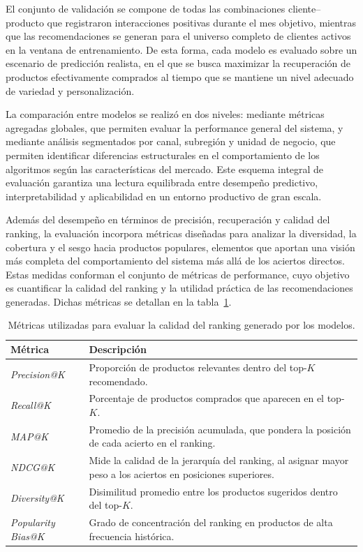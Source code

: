 El conjunto de validación se compone de todas las combinaciones cliente–producto que registraron interacciones positivas durante el mes objetivo, mientras que las recomendaciones se generan para el universo completo de clientes activos en la ventana de entrenamiento. De esta forma, cada modelo es evaluado sobre un escenario de predicción realista, en el que se busca maximizar la recuperación de productos efectivamente comprados al tiempo que se mantiene un nivel adecuado de variedad y personalización.

La comparación entre modelos se realizó en dos niveles: mediante métricas agregadas globales, que permiten evaluar la performance general del sistema, y mediante análisis segmentados por canal, subregión y unidad de negocio, que permiten identificar diferencias estructurales en el comportamiento de los algoritmos según las características del mercado.  
Este esquema integral de evaluación garantiza una lectura equilibrada entre desempeño predictivo, interpretabilidad y aplicabilidad en un entorno productivo de gran escala.  

Además del desempeño en términos de precisión, recuperación y calidad del ranking, la evaluación incorpora métricas diseñadas para analizar la diversidad, la cobertura y el sesgo hacia productos populares, elementos que aportan una visión más completa del comportamiento del sistema más allá de los aciertos directos.
Estas medidas conforman el conjunto de métricas de performance, cuyo objetivo es cuantificar la calidad del ranking y la utilidad práctica de las recomendaciones generadas. Dichas métricas se detallan en la tabla~\ref{tab:eval_performance}.

\begin{table}[H]
    \centering
    \caption[Métricas de performance]{Métricas utilizadas para evaluar la calidad del ranking generado por los modelos.}
    \begin{tabular}{l p{}}
        \toprule
        \textbf{Métrica} & \textbf{Descripción} \\
        \midrule
        \textit{Precision@K} & Proporción de productos relevantes dentro del top-$K$ recomendado. \\
        \textit{Recall@K} & Porcentaje de productos comprados que aparecen en el top-$K$. \\
        \textit{MAP@K} & Promedio de la precisión acumulada, que pondera la posición de cada acierto en el ranking. \\
        \textit{NDCG@K} & Mide la calidad de la jerarquía del ranking, al asignar mayor peso a los aciertos en posiciones superiores. \\
        \textit{Diversity@K} & Disimilitud promedio entre los productos sugeridos dentro del top-$K$. \\
        \textit{Popularity Bias@K} & Grado de concentración del ranking en productos de alta frecuencia histórica. \\
        \bottomrule
    \end{tabular}
    \label{tab:eval_performance}
\end{table}

